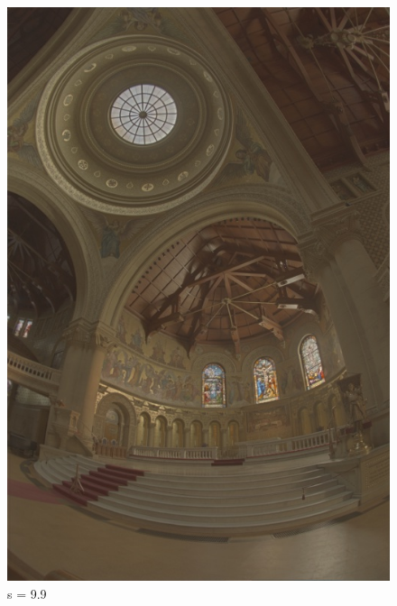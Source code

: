 \documentclass{article}
\begin{document}
\begin{figure}[!htb]
      \includegraphics[scale=.27]{./data/3/svar/s3.jpg}
      \caption{s = 9.9}
    \endminipage
    \end{figure}
\end{document}
